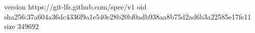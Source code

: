 version https://git-lfs.github.com/spec/v1
oid sha256:37a604a36dc4336f9a1e540c28b20bf0adb938aa8b75d2ad6b3a22585e17fe11
size 349692
